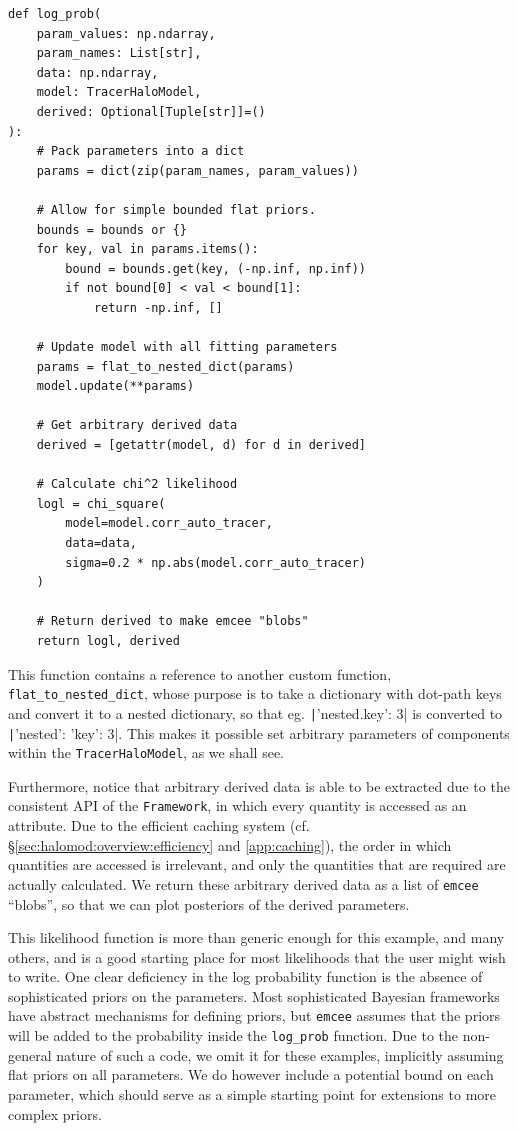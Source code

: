 \documentclass[5p,aas_macros]{elsarticle}
\newcommand{\framework}{\texttt{Framework}}
\begin{document}
\begin{verbatim}
def log_prob(
    param_values: np.ndarray, 
    param_names: List[str], 
    data: np.ndarray,
    model: TracerHaloModel, 
    derived: Optional[Tuple[str]]=()
):
    # Pack parameters into a dict
    params = dict(zip(param_names, param_values))
    
    # Allow for simple bounded flat priors.
    bounds = bounds or {}
    for key, val in params.items():
        bound = bounds.get(key, (-np.inf, np.inf))
        if not bound[0] < val < bound[1]:
            return -np.inf, []
            
    # Update model with all fitting parameters 
    params = flat_to_nested_dict(params)
    model.update(**params)

    # Get arbitrary derived data
    derived = [getattr(model, d) for d in derived]

    # Calculate chi^2 likelihood
    logl = chi_square(
        model=model.corr_auto_tracer, 
        data=data, 
        sigma=0.2 * np.abs(model.corr_auto_tracer)
    )
    
    # Return derived to make emcee "blobs"
    return logl, derived
\end{verbatim}

This function contains a reference to another custom function, \verb|flat_to_nested_dict|, whose purpose is to take a dictionary with 
dot-path keys and convert it to a nested dictionary, so that eg. \texttt|{'nested.key': 3}| is converted to \texttt|{'nested': {'key': 3}}|. This makes it possible set arbitrary parameters of components within the \texttt{Tracer\-Halo\-Model}, as we shall see. 

Furthermore, notice that arbitrary derived data is able to be extracted due to the consistent API of the \framework, in which every quantity is accessed as an attribute. 
Due to the efficient caching system (cf. \S\ref{sec:halomod:overview:efficiency} and \ref{app:caching}), the order in which quantities are accessed is irrelevant, and only the quantities that are required are actually calculated.
We return these arbitrary derived data as a list of \verb|emcee| ``blobs'', so that we can plot posteriors of the derived parameters.

This likelihood function is more than generic enough for this example, and many others, and is a good starting place for most likelihoods that the user might wish to write.
One clear deficiency in the log probability function is the absence of sophisticated priors on the parameters. 
Most sophisticated Bayesian frameworks have abstract mechanisms for defining priors, but \verb|emcee| assumes that the priors will be added to the probability inside the \verb|log_prob| function. 
Due to the non-general nature of such a code, we omit it for these examples, implicitly assuming flat priors on all parameters. 
We do however include a potential bound on each parameter, which should serve as a simple starting point for extensions to more complex priors.
\end{document}
